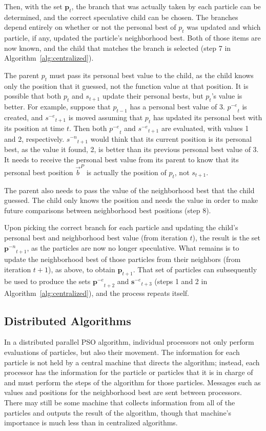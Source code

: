 \documentclass[journal,letterpaper]{IEEEtran}
\newcommand{\alg}[1]{Algorithm~\ref{alg:#1}}
\providecommand{\pers}{\ensuremath{P}}
\providecommand{\pbest}{\ensuremath{\Vec{b}^\pers}}
\providecommand{\noeval}[1]{\ensuremath{#1^{-e}}}
\providecommand{\nonbest}[1]{\ensuremath{#1^{-n}}}
\providecommand{\p}{\ensuremath{p}}
\providecommand{\pset}{\ensuremath{\mathbf{p}}}
\providecommand{\s}{\ensuremath{s}}
\providecommand{\sset}{\ensuremath{\mathbf{s}}}
\begin{document}
Then, with the set $\pset_t$, the branch that was actually taken by each
particle can be determined, and the correct speculative child can be chosen.
The branches depend entirely on whether or not the personal best of $p_t$ was
updated and which particle, if any, updated the particle's neighborhood best.
Both of those items are now known, and the child that matches the branch is
selected (step 7 in \alg{centralized}).

The parent $\p_t$ must pass its personal best value to the child, as the child
knows only the position that it guessed, not the function value at that
position.  It is possible that both $\p_t$ and $\s_{t+1}$ update their
personal bests, but $\p_t$'s value is better.  For example, suppose that
$\p_{t-1}$ has a personal best value of 3.  $\noeval{\p}_t$ is created, and
$\noeval{\s}_{t+1}$ is moved assuming that $\p_t$ has updated its personal
best with its position at time $t$.  Then both $\noeval{\p}_t$ and
$\noeval{\s}_{t+1}$ are evaluated, with values 1 and 2, respectively.
$\nonbest{\s}_{t+1}$ would think that its current position is its personal
best, as the value it found, 2, is better than its previous personal best
value of 3.  It needs to receive the personal best value from its parent to
know that its personal best position $\pbest$ is actually the position of
$\p_t$, not $\s_{t+1}$.

The parent also needs to pass the value of the neighborhood best that the child
guessed.  The child only knows the position and needs the value in order to
make future comparisons between neighborhood best positions (step 8).

Upon picking the correct branch for each particle and updating the child's
personal best and neighborhood best value (from iteration $t$), the result is
the set $\nonbest{\pset}_{t+1}$, as the particles are now no longer
speculative.  What remains is to update the neighborhood best of those
particles from their neighbors (from iteration $t+1$), as above, to obtain
$\pset_{t+1}$.  That set of particles can subsequently be used to produce the
sets $\noeval{\pset}_{t+2}$ and $\noeval{\sset}_{t+3}$ (steps 1 and 2 in
\alg{centralized}), and the process repeats itself.

\subsection{Distributed Algorithms}

\label{sec:distributed}

In a distributed parallel PSO algorithm, individual processors not only perform
evaluations of particles, but also their movement.  The information for each
particle is not held by a central machine that directs the algorithm; instead,
each processor has the information for the particle or particles that it is in
charge of and must perform the steps of the algorithm for those particles.
Messages such as values and positions for the neighborhood best are sent
between processors.  There may still be some machine that collects information
from all of the particles and outputs the result of the algorithm, though that
machine's importance is much less than in centralized algorithms.
\end{document}
